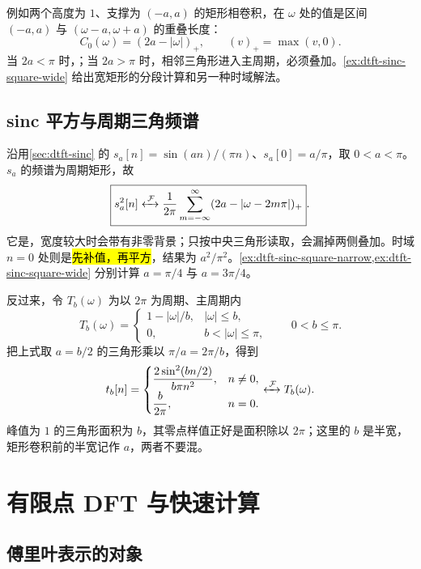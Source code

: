例如两个高度为 $1$、支撑为 $(-a,a)$ 的矩形相卷积，在 $\omega$ 处的值是区间 $(-a,a)$ 与 $(\omega-a,\omega+a)$ 的重叠长度：
\[
  C_0(\omega)=(2a-|\omega|)_+,\qquad
  (v)_+=\max(v,0).
\]
当 $2a<\pi$ 时，；当 $2a>\pi$ 时，相邻三角形进入主周期，必须叠加。\cref{ex:dtft-sinc-square-wide} 给出宽矩形的分段计算和另一种时域解法。

\subsection{sinc 平方与周期三角频谱}
\label{sec:dtft-sinc-square}

沿用\cref{sec:dtft-sinc} 的 $s_a[n]=\sin(an)/(\pi n)$、$s_a[0]=a/\pi$，取 $0<a<\pi$。$s_a$ 的频谱为周期矩形，故
\begin{equation}
  \boxed{s_a^2[n]\mathrel{\xleftrightarrow{\,\mathcal{F}\,}}
    \frac1{2\pi}\sum_{m=-\infty}^{\infty}
       (2a-|\omega-2m\pi|)_+}.
  \label{eq:dtft-sinc-square}
\end{equation}
它是，宽度较大时会带有非零背景；只按中央三角形读取，会漏掉两侧叠加。时域 $n=0$ 处则是\hl{先补值，再平方}，结果为 $a^2/\pi^2$。\cref{ex:dtft-sinc-square-narrow,ex:dtft-sinc-square-wide} 分别计算 $a=\pi/4$ 与 $a=3\pi/4$。

反过来，令 $T_b(\omega)$ 为以 $2\pi$ 为周期、主周期内
\[
  T_b(\omega)=
    \begin{cases}
      1-|\omega|/b,&|\omega|\le b,\\
      0,&b<|\omega|\le\pi,
    \end{cases}
    \qquad 0<b\le\pi.
\]
把上式取 $a=b/2$ 的三角形乘以 $\pi/a=2\pi/b$，得到
\begin{equation}
  t_b[n]=
    \begin{cases}
      \displaystyle\frac{2\sin^2(bn/2)}{b\pi n^2},&n\ne0,\\[4pt]
      \displaystyle\frac{b}{2\pi},&n=0.
    \end{cases}
    \mathrel{\xleftrightarrow{\,\mathcal{F}\,}} T_b(\omega).
  \label{eq:dtft-triangle-pair}
\end{equation}
峰值为 $1$ 的三角形面积为 $b$，其零点样值正好是面积除以 $2\pi$；这里的 $b$ 是半宽，矩形卷积前的半宽记作 $a$，两者不要混。

\section{有限点 DFT 与快速计算}
\label{sec:dtft-dft}

\subsection{傅里叶表示的对象}
\label{sec:fourier-representations}

